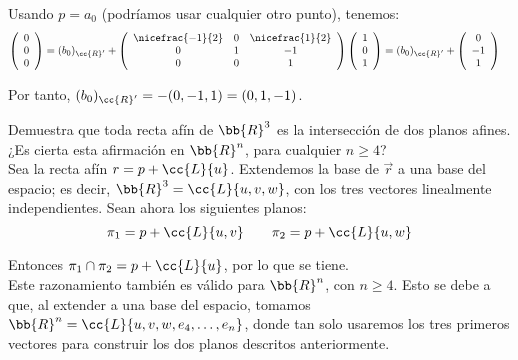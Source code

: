 \begin{ejercicio}
     Usando $p=a_0$ (podríamos usar cualquier otro punto), tenemos:
     \begin{equation*}\begin{split}
         \left(\begin{array}{c}
             0 \\ 0 \\ 0
         \end{array}\right) &= (b_0)_{\cc{R}'} + \left(
            \begin{array}{ccc}
                \nicefrac{-1}{2} & 0 & \nicefrac{1}{2} \\
                0 & 1 & -1 \\
                0 & 0 & 1
            \end{array}
         \right)\left(\begin{array}{c}
             1 \\ 0 \\ 1
         \end{array}\right)
         = (b_0)_{\cc{R}'} + \left(\begin{array}{c}
             0 \\ -1 \\ 1
         \end{array}\right)
     \end{split}\end{equation*}

     Por tanto, $(b_0)_{\cc{R}'} = -(0, -1, 1) = (0,1,-1)$.
\end{ejercicio}

\begin{ejercicio}
    Demuestra que toda recta afín de $\bb{R}^3$ es la intersección de dos planos afines. ¿Es cierta esta afirmación en $\bb{R}^n$, para cualquier $n \geq 4$?\\

    Sea la recta afín $r=p+\cc{L}\{u\}$. Extendemos la base de $\vec{r}$ a una base del espacio; es decir, $\bb{R}^3=\cc{L}\{u,v,w\}$, con los tres vectores linealmente independientes. Sean ahora los siguientes planos:
    \begin{equation*}
        \pi_1 = p+\cc{L}\{u,v\} \qquad \pi_2 = p+\cc{L}\{u,w\}
    \end{equation*}

    Entonces $\pi_1\cap \pi_2 =  p + \cc{L}\{u\}$, por lo que se tiene.\\

    Este razonamiento también es válido para $\bb{R}^n$, con $n\geq 4$. Esto se debe a que, al extender a una base del espacio, tomamos $\bb{R}^n=\cc{L}\{u,v,w,e_4,\dots,e_n\}$, donde tan solo usaremos los tres primeros vectores para construir los dos planos descritos anteriormente.
\end{ejercicio}

